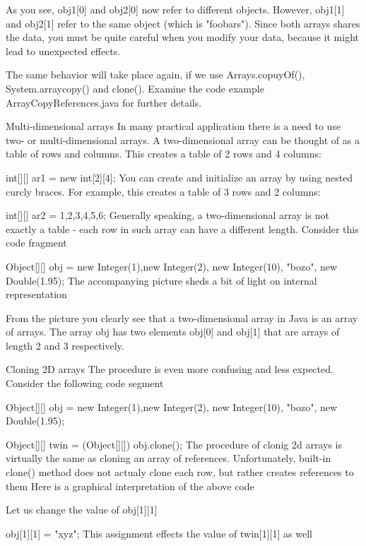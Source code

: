 As you see, obj1[0] and obj2[0] now refer to different objects. However, obj1[1] and obj2[1] refer to the same object (which is "foobars"). Since both arrays shares the data, you must be quite careful when you modify your data, because it might lead to unexpected effects.

The same behavior will take place again, if we use Arrays.copuyOf(), System.arraycopy() and clone(). Examine the code example ArrayCopyReferences.java for further details.

Multi-dimensional arrays
In many practical application there is a need to use two- or multi-dimensional arrays. A two-dimensional array can be thought of as a table of rows and columns. This creates a table of 2 rows and 4 columns:

int[][] ar1 = new int[2][4];
You can create and initialize an array by using nested curcly braces. For example, this creates a table of 3 rows and 2 columns:

int[][] ar2 = {{1,2},{3,4},{5,6}};
Generally speaking, a two-dimensional array is not exactly a table - each row in such array can have a different length. Consider this code fragment

Object[][] obj = {{new Integer(1),new Integer(2)},
                  {new Integer(10), "bozo", new Double(1.95)}};
The accompanying picture sheds a bit of light on internal representation



From the picture you clearly see that a two-dimensional array in Java is an array of arrays. The array obj has two elements obj[0] and obj[1] that are arrays of length 2 and 3 respectively.

Cloning 2D arrays
The procedure is even more confusing and less expected. Consider the following code segment

Object[][] obj = {{new Integer(1),new Integer(2)},
                  {new Integer(10), "bozo", new Double(1.95)}};

Object[][] twin = (Object[][]) obj.clone();
The procedure of clonig 2d arrays is virtually the same as cloning an array of references. Unfortunately, built-in clone() method does not actualy clone each row, but rather creates references to them Here is a graphical interpretation of the above code



Let us change the value of obj[1][1]

obj[1][1] = "xyz";
This assignment effects the value of twin[1][1] as well



